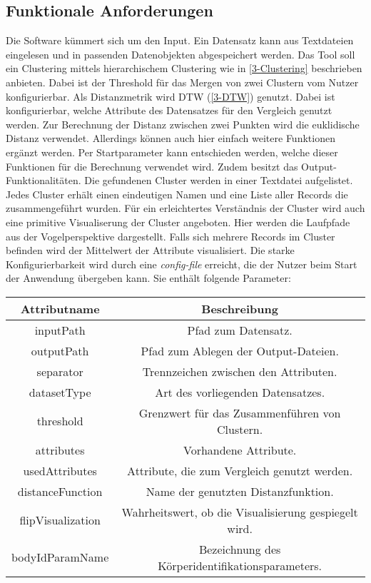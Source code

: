 \subsection{Funktionale Anforderungen}
\label{4-FunktionaleAnforderungen}
Die Software kümmert sich um den Input.
Ein Datensatz kann aus Textdateien eingelesen und in passenden Datenobjekten abgespeichert werden.
Das Tool soll ein Clustering mittels hierarchischem Clustering wie in \autoref{3-Clustering} beschrieben anbieten.
Dabei ist der Threshold für das Mergen von zwei Clustern vom Nutzer konfigurierbar.
Als Distanzmetrik wird \ac{DTW} (\autoref{3-DTW}) genutzt.
Dabei ist konfigurierbar, welche Attribute des Datensatzes für den Vergleich genutzt werden.
Zur Berechnung der Distanz zwischen zwei Punkten wird die euklidische Distanz verwendet.
Allerdings können auch hier einfach weitere Funktionen ergänzt werden.
Per Startparameter kann entschieden werden, welche dieser Funktionen für die Berechnung verwendet wird.
Zudem besitzt das Output-Funktionalitäten.
Die gefundenen Cluster werden in einer Textdatei aufgelistet.
Jedes Cluster erhält einen eindeutigen Namen und eine Liste aller Records die zusammengeführt wurden.
Für ein erleichtertes Verständnis der Cluster wird auch eine primitive Visualiserung der Cluster angeboten.
Hier werden die Laufpfade aus der Vogelperspektive dargestellt.
Falls sich mehrere Records im Cluster befinden wird der Mittelwert der Attribute visualisiert.
Die starke Konfigurierbarkeit wird durch eine \emph{config-file} erreicht,
die der Nutzer beim Start der Anwendung übergeben kann.
Sie enthält folgende Parameter:

\begin{center}
    \begin{tabular}{ |c|c| } 
     \hline
     Attributname & Beschreibung \\
     \hline \hline
     inputPath & Pfad zum Datensatz. \\
     \hline
     outputPath & Pfad zum Ablegen der Output-Dateien.  \\
     \hline
     separator & Trennzeichen zwischen den Attributen. \\
     \hline
     datasetType & Art des vorliegenden Datensatzes. \\
     \hline
     threshold & Grenzwert für das Zusammenführen von Clustern. \\
     \hline
     attributes & Vorhandene Attribute. \\
     \hline
     usedAttributes & Attribute, die zum Vergleich genutzt werden. \\
     \hline
     distanceFunction & Name der genutzten Distanzfunktion. \\
     \hline
     flipVisualization & Wahrheitswert, ob die Visualisierung gespiegelt wird. \\
     \hline
     bodyIdParamName & Bezeichnung des Körperidentifikationsparameters. \\
     \hline
    \end{tabular}
  \end{center}

